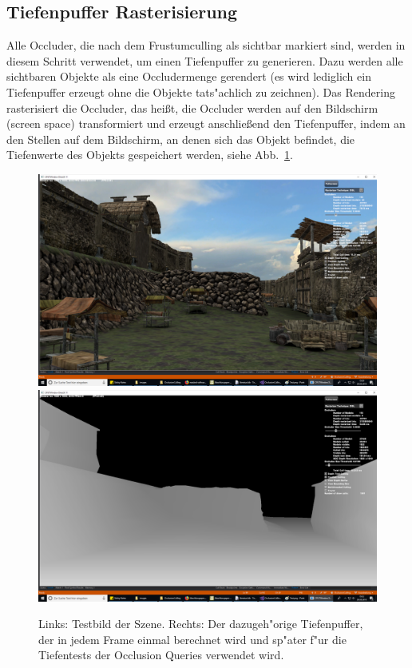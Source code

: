 \documentclass[journal]{vgtc}
\begin{document}
\subsection{Tiefenpuffer Rasterisierung}
Alle Occluder, die nach dem Frustumculling als sichtbar markiert sind, werden in diesem Schritt verwendet, um einen Tiefenpuffer zu generieren. Dazu werden alle sichtbaren Objekte als eine Occludermenge \glqq gerendert\grqq{} (es wird lediglich ein Tiefenpuffer erzeugt ohne die Objekte tats"achlich zu zeichnen). Das Rendering rasterisiert die Occluder, das hei{\ss}t, die Occluder werden auf den Bildschirm (screen space) transformiert und erzeugt anschlie{\ss}end den Tiefenpuffer, indem an den Stellen auf dem Bildschirm, an denen sich das Objekt befindet, die Tiefenwerte des Objekts gespeichert werden, siehe Abb.\ \ref{fig:db}.
\begin{figure}%
\includegraphics[width=0.5\columnwidth]{images/Base1.png}%
\includegraphics[width=0.5\columnwidth]{images/Base1DB.png}%
\caption{Links: Testbild der Szene. Rechts: Der dazugeh"orige Tiefenpuffer, der in jedem Frame einmal berechnet wird und sp"ater f"ur die Tiefentests der Occlusion Queries verwendet wird.}%
\label{fig:db}%
\end{figure}
\end{document}
